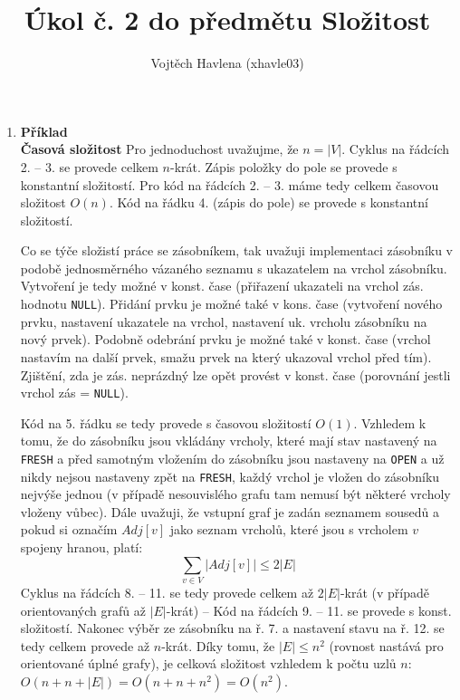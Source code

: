 \documentclass[a4paper,12pt]{article}
\title{Úkol č. 2 do předmětu Složitost}
\author{Vojtěch Havlena (xhavle03)}
\date{}
\begin{document}
\maketitle


\begin{enumerate}[label=\textbf{\arabic*}.]

 \item {\bfseries Příklad}\\
  \textbf{Časová složitost} Pro jednoduchost uvažujme, že $n = |V|$. Cyklus na řádcích 2. -- 3. se provede celkem $n$-krát. 
  Zápis položky do pole se provede s konstantní složitostí. Pro kód na řádcích 2. -- 3. máme tedy celkem časovou složitost $O(n)$.
  Kód na řádku 4. (zápis do pole) se provede s konstantní složitostí.
  
  Co se týče složistí práce se zásobníkem, tak uvažuji implementaci zásobníku v podobě jednosměrného vázaného seznamu s ukazatelem
  na vrchol zásobníku. Vytvoření je tedy možné v konst. čase (přiřazení ukazateli na vrchol zás. hodnotu \texttt{NULL}). Přidání prvku
  je možné také v kons. čase (vytvoření nového prvku, nastavení ukazatele na vrchol, nastavení uk. vrcholu zásobníku na nový prvek).
  Podobně odebrání prvku je možné také v konst. čase (vrchol nastavím na další prvek, smažu prvek na který ukazoval vrchol před tím).
  Zjištění, zda je zás. neprázdný lze opět provést v konst. čase (porovnání jestli vrchol zás = \texttt{NULL}).
  
  Kód na 5. řádku se tedy provede s časovou složitostí $O(1)$. Vzhledem k tomu, že do zásobníku jsou vkládány vrcholy, které mají
  stav nastavený na \texttt{FRESH} a před samotným vložením do zásobníku jsou nastaveny na \texttt{OPEN} a už nikdy nejsou nastaveny zpět na \texttt{FRESH}, každý
  vrchol je vložen do zásobníku nejvýše jednou (v případě nesouvislého grafu tam nemusí být některé vrcholy vloženy vůbec). 
  Dále uvažuji, že vstupní 
  graf je zadán seznamem sousedů a pokud si označím $Adj[v]$ jako seznam vrcholů, které jsou s vrcholem $v$ spojeny hranou, platí: 
  $$
    \sum_{v\in V} |Adj[v]| \leq 2|E|
  $$
  Cyklus na
  řádcích 8. -- 11. se tedy provede celkem až $2|E|$-krát (v případě orientovaných grafů až $|E|$-krát) -- 
  Kód na řádcích 9. -- 11. se provede s konst. složitostí. Nakonec výběr
  ze zásobníku na ř. 7. a nastavení stavu na ř. 12. se tedy celkem provede až $n$-krát. Díky tomu, že $|E| \leq n^2$ (rovnost nastává pro 
  orientované úplné grafy), je celková složitost vzhledem k počtu uzlů $n$: $O(n + n + |E|) = O(n +n + n^2) = O(n^2)$.
  

\end{enumerate}
\end{document}
